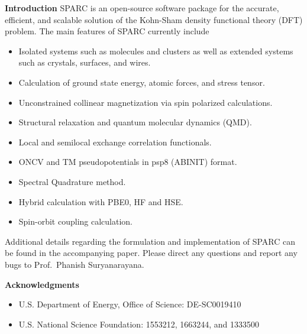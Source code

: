 \begin{frame}[allowframebreaks]{\textbf{Introduction}} \label{Introduction}
SPARC is an open-source software package for the accurate, efficient, and scalable solution of the Kohn-Sham density functional theory (DFT) problem. The main features of SPARC currently include
\begin{itemize}
  \item Isolated systems such as molecules and clusters as well as extended systems such as crystals, surfaces, and wires. 
  \item Calculation of ground state energy, atomic forces, and stress tensor.
  \item Unconstrained collinear magnetization via spin polarized calculations.
  \item Structural relaxation and quantum molecular dynamics (QMD). 
  \item Local and semilocal exchange correlation functionals. 
  \item ONCV and TM pseudopotentials in psp8 (ABINIT) format. 
  \item Spectral Quadrature method.
  \item Hybrid calculation with PBE0, HF and HSE.
  \item Spin-orbit coupling calculation.
\end{itemize}
Additional details regarding the formulation and implementation of SPARC can be found in the accompanying paper. Please direct any questions and report any bugs to Prof.~Phanish Suryanarayana.

\end{frame}


\begin{frame}[allowframebreaks]{\textbf{Acknowledgments}} \label{Acknowledgments}

\begin{itemize}
    \item U.S. Department of Energy, Office of Science: DE-SC0019410
    \item U.S. National Science Foundation: 1553212, 1663244, and 1333500
\end{itemize}

\end{frame}


